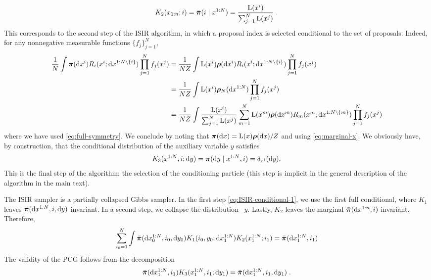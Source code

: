 \begin{equation}
\label{eq:ISIR-conditional-2}
K_2(x_{1:n}; i)= \bar{\boldsymbol{\pi}}(i \mid x^{1:N}) = \frac{\mathrm{L}(x^i)}{\sum_{j=1}^N \mathrm{L}(x^j)} \;.
\end{equation}
This corresponds to the second step of the ISIR algorithm, in which a proposal index is selected conditional to the set of proposals.
Indeed, for any nonnegative measurable functions $\{f_j\}_{j=1}^N$,
\begin{align*}
\frac{1}{N} \int \boldsymbol{\pi}(\mathrm{d} x^i)R_i(x^i; \mathrm{d} x^{1:N \setminus \{i\}}) \prod_{j=1}^N f_j(x^j)
& = \frac{1}{N Z} \int \mathrm{L}(x^i) \boldsymbol{\rho}(\mathrm{d} x^i)  R_i(x^i;  \mathrm{d} x^{1:N \setminus \{i\}}) \prod_{j=1}^N f_j(x^j) \\
& = \frac{1}{N Z} \int \mathrm{L}(x^i) \boldsymbol{\rho}_N(\mathrm{d}x^{1:N}) \prod_{j=1}^N f_j(x^j) \\
& = \frac{1}{N Z} \int \frac{\mathrm{L}(x^i)}{\sum_{j=1}^N \mathrm{L}(x^j)}
\sum_{m=1}^N \mathrm{L}(x^m) \boldsymbol{\rho}(\mathrm{d} x^m) R_m(x^m;  \mathrm{d} x^{1:N \setminus \{m\}}) \prod_{j=1}^N f_j(x^j)
\end{align*}
where we have used \eqref{eq:full-symmetry}. We conclude by noting that $\boldsymbol{\pi}(\mathrm{d} x)= \mathrm{L}(x) \boldsymbol{\rho}(\mathrm{d} x) / Z$ and using \eqref{eq:marginal-x}.
We obviously have, by construction, that the conditional distribution of the auxiliary variable $y$  satisfies
\begin{equation}
\label{eq:ISIR-conditional-3}
K_3(x^{1:N}, i; \mathrm{d} y)= \boldsymbol{\pi}(\mathrm{d} y \mid x^{1:N}, i)= \delta_{x^i}(\mathrm{d} y).
\end{equation}
This is the final step of the algorithm: the selection of the conditioning particle (this step is implicit in the general description of the algorithm in the main text).

The ISIR sampler is a partially collapsed Gibbs sampler. In the first step \eqref{eq:ISIR-conditional-1}, we use the first full conditional, where $K_1$ leaves $\bar{\boldsymbol{\pi}}(\mathrm{d} x^{1:N}, i, \mathrm{d} y)$ invariant. In a second step, we collapse the distribution \wrt\ $y$. Lastly, $K_2$ leaves the marginal $\bar{\boldsymbol{\pi}}(\mathrm{d} x^{1:n}, i)$ invariant. Therefore,
\[
\sum_{i_0=1}^N \int \bar{\boldsymbol{\pi}}(\mathrm{d} x_0^{1:N},i_0,\mathrm{d} y_0)
K_1(i_0,y_0; \mathrm{d} x_1^{1:N}) K_2(x_1^{1:N};i_1)= \bar{\boldsymbol{\pi}}(\mathrm{d} x_1^{1:N},i_1)
\]
The validity of the PCG follows from the decomposition
\[
\bar{\boldsymbol{\pi}}(\mathrm{d} x_1^{1:N},i_1) K_3(x_1^{1:N},i_1 ; \mathrm{d} y_1)= \bar{\boldsymbol{\pi}}(\mathrm{d} x_1^{1:N},i_1, \mathrm{d} y_1) \;.
\]

